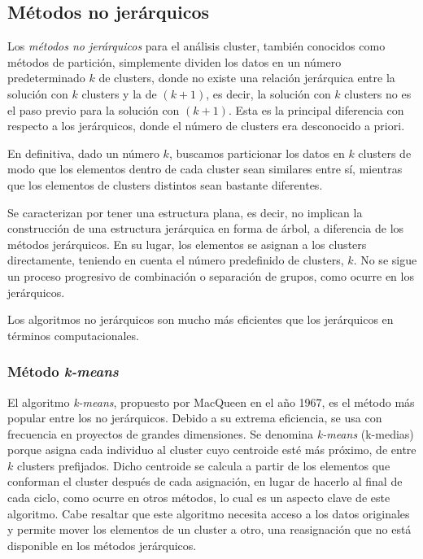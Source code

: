 \subsection{Métodos no jerárquicos} %

Los \textit{métodos no jerárquicos} para el análisis cluster, también conocidos como métodos de partición, simplemente dividen los datos en un número predeterminado $k$
de clusters, donde no existe una relación jerárquica entre la solución con $k$ clusters y la de $(k+1)$, es decir, la solución con $k$ clusters no es el paso previo para
la solución con $(k+1)$. Esta es la principal diferencia con respecto a los jerárquicos, donde el número de clusters era desconocido a priori. \newline

En definitiva, dado un número $k$, buscamos particionar los datos en $k$ clusters de modo que los elementos dentro de cada cluster sean similares entre sí, mientras que los elementos 
de clusters distintos sean bastante diferentes\cite{Bib-1}\cite{Bib-2}.\newline

Se caracterizan por tener una estructura plana, es decir, no implican la construcción de una estructura jerárquica en forma de árbol, a diferencia de los métodos jerárquicos.
En su lugar, los elementos se asignan a los clusters directamente, teniendo en cuenta el número predefinido de clusters, $k$. No se sigue un proceso progresivo de combinación
o separación de grupos, como ocurre en los jerárquicos\cite{bejar-AC}. \newline

\begin{nota}
    Los algoritmos no jerárquicos son mucho más eficientes que los jerárquicos en términos computacionales.
\end{nota}

\subsubsection{Método \textit{k-means}}

El algoritmo \textit{k-means}, propuesto por MacQueen en el año 1967, es el método más popular entre los no jerárquicos. Debido a su extrema eficiencia, se usa con frecuencia en proyectos de
grandes dimensiones. Se denomina \textit{k-means} (k-medias) porque asigna cada individuo al cluster cuyo centroide esté más próximo, de entre $k$ clusters prefijados. Dicho centroide se calcula 
a partir de los elementos que conforman el cluster después de cada asignación, en lugar de hacerlo al final de cada ciclo, como ocurre en otros métodos, lo cual es un aspecto
clave de este algoritmo. \newline
Cabe resaltar que este algoritmo necesita acceso a los datos originales y permite mover los elementos de un cluster a otro, una reasignación que no está disponible en los métodos 
jerárquicos. \newline

